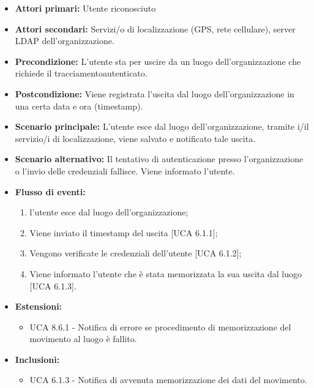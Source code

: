 \begin{itemize}
	\item \textbf{Attori primari:} Utente riconosciuto
	\item \textbf{Attori secondari:} Servizi/o di localizzazione (GPS, rete cellulare), server LDAP dell'organizzazione.
	\item \textbf{Precondizione:} L'utente sta per uscire da un luogo dell'organizzazione che richiede il tracciamentoautenticato.
	\item \textbf{Postcondizione:} Viene registrata l'uscita dal luogo dell'organizzazione in una certa data e ora (timestamp).
	\item \textbf{Scenario principale:} L'utente esce dal luogo dell'organizzazione, tramite i/il servizio/i di localizzazione, viene salvato e notificato tale uscita. 
	\item \textbf{Scenario alternativo:} Il tentativo di autenticazione presso l'organizzazione o l'invio delle credenziali fallisce. Viene informato l'utente.
		\item \textbf{Flusso di eventi:}
	\begin{enumerate}
		\item l'utente esce dal luogo dell'organizzazione;
		\item Viene inviato il timestamp\ap{G}  del uscita [UCA 6.1.1];
		\item Vengono verificate le credenziali dell'utente [UCA 6.1.2];
		\item Viene informato l'utente che è stata memorizzata la sua uscita dal luogo [UCA 6.1.3].
	\end{enumerate}
	\item \textbf{Estensioni:}
		\begin{itemize}
		\item UCA 8.6.1 - Notifica di errore se procedimento di memorizzazione del movimento al luogo è fallito.
	\end{itemize}
	\item \textbf{Inclusioni:}
	\begin{itemize}
		\item UCA 6.1.3 - Notifica di avvenuta memorizzazione dei dati del movimento.
	\end{itemize}
\end{itemize}

